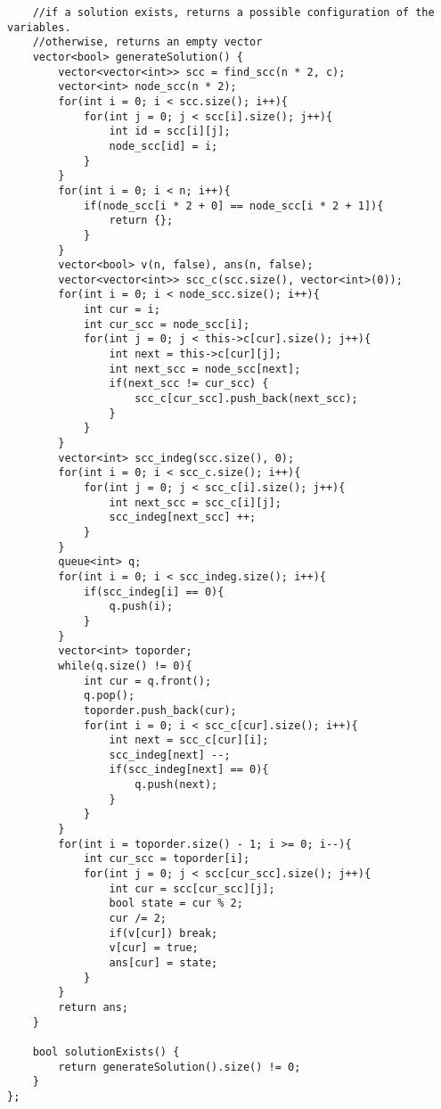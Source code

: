 \documentclass[8pt, headheight=10pt, a4paper]{article}
\begin{document}
\begin{multicols*}{3}
\begin{lstlisting}
    //if a solution exists, returns a possible configuration of the variables. 
    //otherwise, returns an empty vector
    vector<bool> generateSolution() {
        vector<vector<int>> scc = find_scc(n * 2, c);
        vector<int> node_scc(n * 2);
        for(int i = 0; i < scc.size(); i++){
            for(int j = 0; j < scc[i].size(); j++){
                int id = scc[i][j];
                node_scc[id] = i;
            }
        }
        for(int i = 0; i < n; i++){
            if(node_scc[i * 2 + 0] == node_scc[i * 2 + 1]){
                return {};
            }
        }
        vector<bool> v(n, false), ans(n, false);
        vector<vector<int>> scc_c(scc.size(), vector<int>(0));
        for(int i = 0; i < node_scc.size(); i++){
            int cur = i;
            int cur_scc = node_scc[i];
            for(int j = 0; j < this->c[cur].size(); j++){
                int next = this->c[cur][j];
                int next_scc = node_scc[next];
                if(next_scc != cur_scc) {
                    scc_c[cur_scc].push_back(next_scc);
                }
            }
        }
        vector<int> scc_indeg(scc.size(), 0);
        for(int i = 0; i < scc_c.size(); i++){
            for(int j = 0; j < scc_c[i].size(); j++){
                int next_scc = scc_c[i][j];
                scc_indeg[next_scc] ++;
            }
        }
        queue<int> q;
        for(int i = 0; i < scc_indeg.size(); i++){
            if(scc_indeg[i] == 0){
                q.push(i);
            }
        }
        vector<int> toporder;
        while(q.size() != 0){
            int cur = q.front();
            q.pop();
            toporder.push_back(cur);
            for(int i = 0; i < scc_c[cur].size(); i++){
                int next = scc_c[cur][i];
                scc_indeg[next] --;
                if(scc_indeg[next] == 0){
                    q.push(next);
                }
            }
        }
        for(int i = toporder.size() - 1; i >= 0; i--){
            int cur_scc = toporder[i];
            for(int j = 0; j < scc[cur_scc].size(); j++){
                int cur = scc[cur_scc][j];
                bool state = cur % 2;
                cur /= 2;
                if(v[cur]) break;
                v[cur] = true;
                ans[cur] = state;
            }
        }
        return ans;
    }

    bool solutionExists() {
        return generateSolution().size() != 0;
    }
};
\end{lstlisting}


\end{multicols*}
\end{document}
